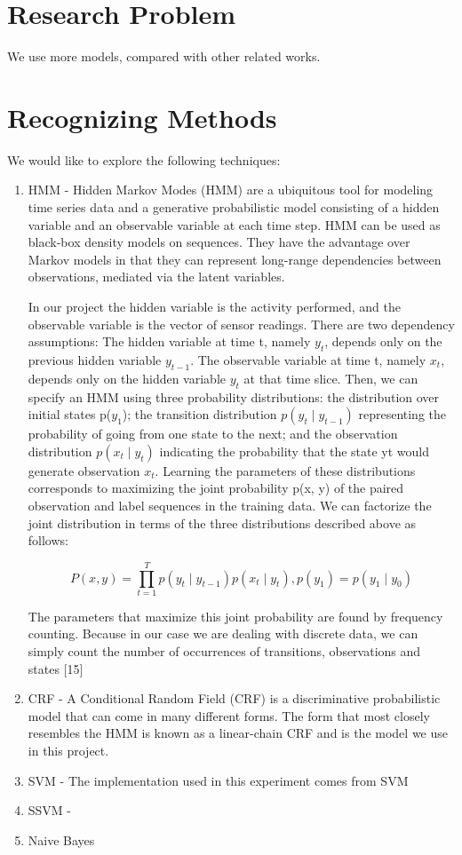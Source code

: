 \documentclass[11pt, oneside]{article}   	%
\begin{document}
\section{Research Problem}

We use more models, compared with other related works.

\section{Recognizing Methods}
We would like to explore the following techniques:
	\begin{enumerate}
\item HMM - 
Hidden Markov Modes (HMM) are a ubiquitous tool for modeling time series data and a generative probabilistic model consisting of a hidden variable and an observable variable at each time step. HMM can be used as black-box density models on sequences. They have the advantage over Markov models in that they can represent long-range dependencies between observations, mediated via the latent variables. 

In our project the hidden variable is the activity performed, and the observable variable is the vector of sensor readings. There are two dependency assumptions: The hidden variable at time t, namely $y_{t}$, depends only on the previous hidden variable $y_{t-1}$. The observable variable at time t, namely $x_{t}$, depends only on the hidden variable $y_{t}$ at that time slice. Then, we can specify an HMM using three probability distributions: the distribution over initial states p($y_{1}$); the transition distribution $p(y_{t}\mid y_{t-1})$ representing the probability of going from one state to the next; and the observation distribution $p(x_{t}\mid y_{t})$ indicating the probability that the state yt would generate observation $x_{t}$.
Learning the parameters of these distributions corresponds to maximizing the joint probability p(x, y) of the paired observation and label sequences in the training data. We can factorize the joint distribution in terms of the three distributions described above as follows:

\begin{equation}
P(x,y)=\prod_{t=1}^{T}p(y_{t}\mid y_{t-1})p(x_{t}\mid y_{t}), p(y_{1}) = p(y_{1}\mid y_{0})
\end{equation}

The parameters that maximize this joint probability are found by frequency counting. Because in our case we are dealing with discrete data, we can simply count the number of occurrences of transitions, observations and states [15]

\item CRF - 
A Conditional Random Field (CRF) is a discriminative probabilistic model that can come in many different forms. The form that most closely resembles the HMM is known as a linear-chain CRF and is the model we use in this project.


\item SVM - 
The implementation used in this experiment comes from SVM

\item SSVM - 

\item Naive Bayes
	\end{enumerate}
\end{document}

